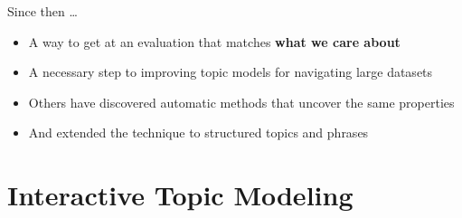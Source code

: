 \documentclass[compress]{beamer}
\begin{document}
\begin{frame}{Since then \dots}

  \begin{itemize}
    \item A way to get at an evaluation that matches {\bf what we care about}
    \item A necessary step to improving topic models for navigating large datasets~\cite{talley-11}
    \item Others have discovered automatic methods that uncover the same properties~\cite{newman-10,mimno-11}
    \item And extended the technique to structured topics and phrases~\cite{lindsey-12,weninger-12}
  \end{itemize}

\end{frame}

\section{Interactive Topic Modeling}
\end{document}
